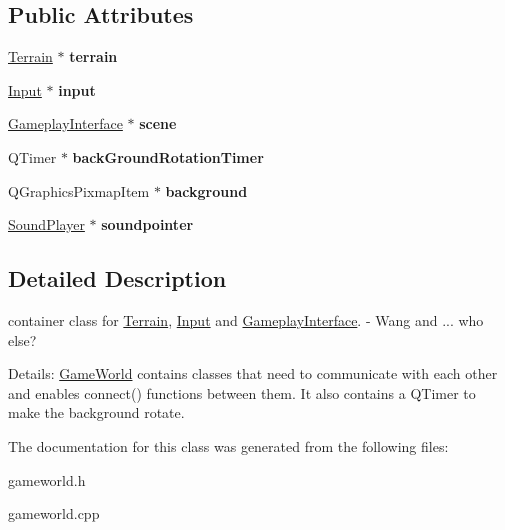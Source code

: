 \subsection*{Public Attributes}
\begin{DoxyCompactItemize}
\item 
\hyperlink{class_terrain}{Terrain} $\ast$ {\bfseries terrain}\hypertarget{class_game_world_a97a0e2bf2693f10e7ab7481ada618191}{}\label{class_game_world_a97a0e2bf2693f10e7ab7481ada618191}

\item 
\hyperlink{class_input}{Input} $\ast$ {\bfseries input}\hypertarget{class_game_world_af51a9a6f7f2f318a7f4842bc7ddddf67}{}\label{class_game_world_af51a9a6f7f2f318a7f4842bc7ddddf67}

\item 
\hyperlink{class_gameplay_interface}{Gameplay\+Interface} $\ast$ {\bfseries scene}\hypertarget{class_game_world_a470317d29e5b698b1e08dc983d78ff50}{}\label{class_game_world_a470317d29e5b698b1e08dc983d78ff50}

\item 
Q\+Timer $\ast$ {\bfseries back\+Ground\+Rotation\+Timer}\hypertarget{class_game_world_a12fff5decf2e34382c409923ec6f4668}{}\label{class_game_world_a12fff5decf2e34382c409923ec6f4668}

\item 
Q\+Graphics\+Pixmap\+Item $\ast$ {\bfseries background}\hypertarget{class_game_world_a42c3f3a06320763c952771c93f49489d}{}\label{class_game_world_a42c3f3a06320763c952771c93f49489d}

\item 
\hyperlink{class_sound_player}{Sound\+Player} $\ast$ {\bfseries soundpointer}\hypertarget{class_game_world_a133678d6bc4754bff909f0e744923549}{}\label{class_game_world_a133678d6bc4754bff909f0e744923549}

\end{DoxyCompactItemize}


\subsection{Detailed Description}
container class for \hyperlink{class_terrain}{Terrain}, \hyperlink{class_input}{Input} and \hyperlink{class_gameplay_interface}{Gameplay\+Interface}. -\/ Wang and ... who else? 

Details\+: \hyperlink{class_game_world}{Game\+World} contains classes that need to communicate with each other and enables connect() functions between them. It also contains a Q\+Timer to make the background rotate. 

The documentation for this class was generated from the following files\+:\begin{DoxyCompactItemize}
\item 
gameworld.\+h\item 
gameworld.\+cpp\end{DoxyCompactItemize}

